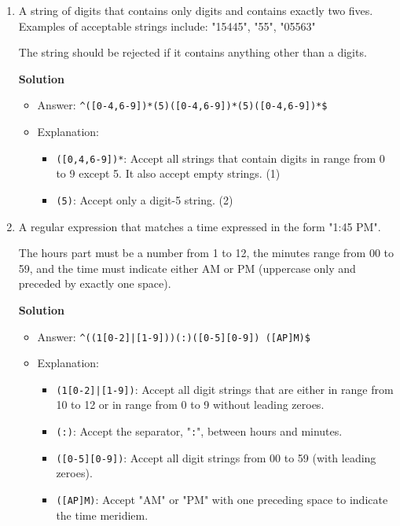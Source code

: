 \documentclass[12pt]{article}
\begin{document}
\begin{enumerate}
    \item A string of digits that contains only digits and contains exactly two fives. Examples of acceptable strings include: "15445", "55", "05563"

          The string should be rejected if it contains anything other than a digits.

          \centerline{\textbf{Solution}}

          \begin{itemize}
              \item Answer: \texttt{\^}\texttt{([0-4,6-9])*(5)([0-4,6-9])*(5)([0-4,6-9])*\$}
              \item Explanation:

                    \begin{itemize}
                        \item \texttt{([0,4,6-9])*}: Accept all strings that contain digits in range from 0 to 9 except 5. It also accept empty strings. (1)
                        \item \texttt{(5)}: Accept only a digit-5 string. (2)
                    \end{itemize}
          \end{itemize}

    \item A regular expression that matches a time expressed in the form "1:45 PM".

          The hours part must be a number from 1 to 12, the minutes range from 00 to 59, and the time must indicate either AM or PM (uppercase only and preceded by exactly one space).

          \centerline{\textbf{Solution}}

          \begin{itemize}
              \item Answer: \texttt{\^}\texttt{((1[0-2]|[1-9]))(:)([0-5][0-9]) ([AP]M)\$}
              \item Explanation:

                    \begin{itemize}
                        \item \texttt{(1[0-2]|[1-9])}: Accept all digit strings that are either in range from 10 to 12 or in range from 0 to 9 without leading zeroes.
                        \item \texttt{(:)}: Accept the separator, "\texttt{:}", between hours and minutes.
                        \item \texttt{([0-5][0-9])}: Accept all digit strings from 00 to 59 (with leading zeroes).
                        \item \texttt{([AP]M)}: Accept "AM" or "PM" with one preceding space to indicate the time meridiem.
                    \end{itemize}
          \end{itemize}


\end{enumerate}
\end{document}
